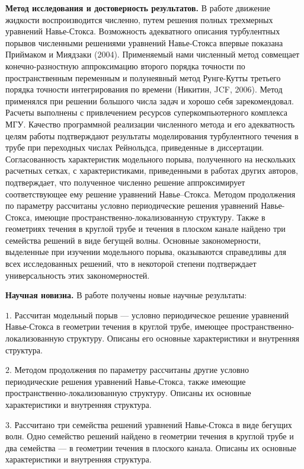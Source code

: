 \textbf{Метод исследования и достоверность результатов.}
В работе движение жидкости воспроизводится численно, путем решения полных трехмерных уравнений Навье-Стокса. Возможность адекватного описания турбулентных порывов численными решениями уравнений Навье-Стокса впервые показана Приймаком и Миядзаки (2004). Применяемый нами численный метод совмещает конечно-разностную аппроксимацию второго порядка точности по пространственным переменным и полунеявный метод Рунге-Кутты третьего порядка точности интегрирования по времени (Никитин, JCF, 2006). Метод применялся при решении большого числа задач и хорошо себя зарекомендовал. Расчеты выполнены с привлечением ресурсов суперкомпьютерного комплекса МГУ. Качество программной реализации численного метода и его адекватность целям работы подтверждают результаты моделирования турбулентного течения в трубе при переходных числах Рейнольдса, приведенные в диссертации. Согласованность характеристик модельного порыва, полученного на нескольких расчетных сетках, с характеристиками, приведенными в работах других авторов, подтверждает, что полученное численно решение аппроксимирует соответствующее ему решение уравнений Навье--Стокса. Методом продолжения по параметру рассчитаны условно периодические решения уравнений Навье-Стокса, имеющие пространственно-локализованную структуру. Также в геометриях течения в круглой трубе и течения в плоском канале найдено три семейства решений в виде бегущей волны. Основные закономерности, выделенные при изучении модельного порыва, оказываются справедливы для всех исследованных решений, что в некоторой степени подтверждает универсальность этих закономерностей. 

{\bf Научная новизна.} В работе получены новые научные результаты:

\noindent $1.$  Рассчитан модельный порыв --- условно периодическое решение уравнений Навье-Стокса в геометрии течения в круглой трубе, имеющее пространственно-локализованную структуру. Описаны его основные характеристики и внутренняя структура. 

\noindent $2.$  Методом продолжения по параметру рассчитаны другие условно периодические решения уравнений Навье-Стокса, также имеющие пространственно-локализованную структуру. Описаны их основные характеристики и внутренняя структура. 

\noindent $3.$  Рассчитано три семейства решений уравнений Навье-Стокса в виде бегущих волн. Одно семейство решений найдено в геометрии течения в круглой трубе и два семейства --- в геометрии течения в плоского канала. Описаны их основные характеристики и внутренняя структура. 


